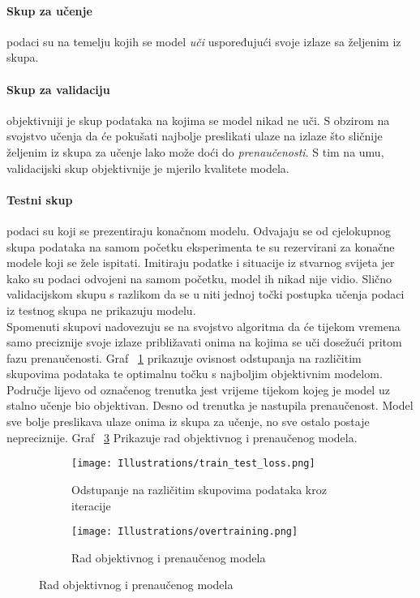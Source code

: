 \paragraph{Skup za učenje}
podaci su na temelju kojih se model \emph{uči} uspoređujući svoje izlaze sa željenim iz skupa.

\paragraph{Skup za validaciju} 
objektivniji je skup podataka na kojima se model nikad ne uči.
S obzirom na svojstvo učenja da će pokušati najbolje preslikati ulaze na izlaze što sličnije željenim iz skupa za učenje lako može doći do \emph{prenaučenosti}.
S tim na umu, validacijski skup objektivnije je mjerilo kvalitete modela.

\paragraph{Testni skup}
podaci su koji se prezentiraju konačnom modelu.
Odvajaju se od cjelokupnog skupa podataka na samom početku eksperimenta te su rezervirani za konačne modele koji se žele ispitati.
Imitiraju podatke i situacije iz stvarnog svijeta jer kako su podaci odvojeni na samom početku, model ih nikad nije vidio.
Slično validacijskom skupu s razlikom da se u niti jednoj točki postupka učenja podaci iz testnog skupa ne prikazuju modelu. \\

Spomenuti skupovi nadovezuju se na svojstvo algoritma da će tijekom vremena samo preciznije svoje izlaze približavati onima na kojima se uči dosežući pritom fazu prenaučenosti.
Graf ~\ref{fig:train_test_loss} prikazuje ovisnost odstupanja na različitim skupovima podataka te optimalnu točku s najboljim objektivnim modelom.
Područje lijevo od označenog trenutka jest vrijeme tijekom kojeg je model uz stalno učenje bio objektivan. 
Desno od trenutka je nastupila prenaučenost.
Model sve bolje preslikava ulaze onima iz skupa za učenje, no sve ostalo postaje nepreciznije.
Graf ~\ref{fig:overfitting} Prikazuje rad objektivnog i prenaučenog modela.

\begin{figure}
	\caption{Grafički prikaz odstupanja kroz iteracije na skupu za učenje i validacijskom skupu te prikaz rada prenaučenog modela}
	\begin{subfigure}[t]{0.48\textwidth}
		\texttt{[image: Illustrations/train\_test\_loss.png]}
		\caption{Odstupanje na različitim skupovima podataka kroz iteracije}
		\label{fig:train_test_loss}
	\end{subfigure}
	\hspace{\fill}
	\begin{subfigure}[t]{0.48\textwidth}
		\texttt{[image: Illustrations/overtraining.png]}
		\caption{Rad objektivnog i prenaučenog modela}
		\label{fig:overfitting}
	\end{subfigure}
\end{figure}

